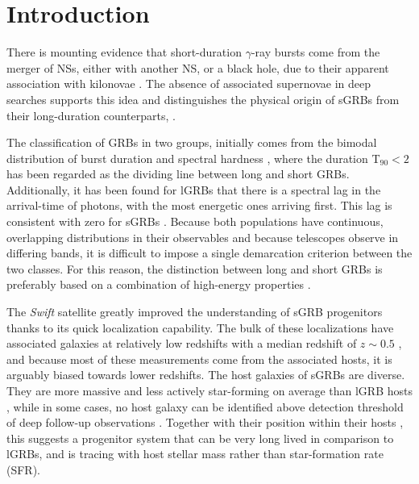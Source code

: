\documentclass{aa}    %
\begin{document}
\maketitle

\section{Introduction}

There is mounting evidence that short-duration $\gamma$-ray bursts
come from the merger of NSs, either with another NS, or a black
hole, due to their apparent association with kilonovae \citep{Barnes2013a,
	Tanvir2013b, Yang2015, Jin2016, Rosswog2016}. The absence of associated
supernovae in deep searches \citep[e.g.][]{Hjorth2005a,Fox2005,Hjorth2005b, Kann2011}
supports this idea and distinguishes the physical origin of sGRBs from their
long-duration counterparts, \citep[albeit see also][]{Fynbo2006b, Valle2006, Gal-Yam2006}.

The classification of GRBs in two groups, initially comes from the bimodal
distribution of burst duration and spectral hardness \citet{Kouveliotou1993},
where the duration T$_{90} < 2$ has been regarded as the dividing line between long
and short GRBs. Additionally, it has been found for lGRBs that there is a
spectral lag in the arrival-time of photons, with the most energetic ones
arriving first. This lag is consistent with zero for sGRBs
\citep{Norris2006}. Because both populations have continuous, overlapping
distributions in their observables and because telescopes observe in differing
bands, it is difficult to impose a single demarcation criterion between the two
classes. For this reason, the distinction between long and short GRBs is
preferably based on a combination of high-energy properties \citep{Zhang2009,
	Bromberg2012a, Bromberg2013}.

The \textit{Swift} satellite \citep{Gehrels2004} greatly improved the
understanding of sGRB progenitors thanks to its quick localization capability.
The bulk of these localizations have associated galaxies at relatively low
redshifts with a median redshift of $z\sim0.5$ \citep{Berger2014}, and because
most of these measurements come from the associated hosts, it is arguably biased
towards lower redshifts. The host galaxies of sGRBs are diverse. They are more
massive and less actively star-forming on average than lGRB hosts
\citep{Fong2013b}, while in some cases, no host galaxy can be identified above
detection threshold of deep follow-up observations \citep{Berger2010a,
	Tunnicliffe2014}. Together with their position within their hosts
\citep{Fong2013a}, this suggests a progenitor system that can be very long lived
in comparison to lGRBs, and is tracing with host stellar mass rather than
star-formation rate (SFR).
\end{document}
